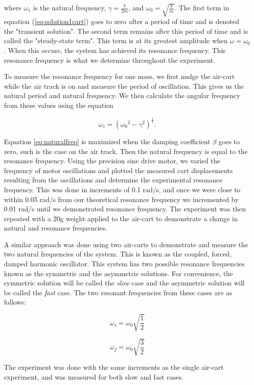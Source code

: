 \noindent where $\omega_1$ is the natural frequency, $\gamma = \frac{b}{2m}$, and $\omega_0 = \sqrt{\frac{k}{m}}$. The first term in equation (\ref{eq:solution1cart}) goes to zero after a period of time and is denoted the "transient solution". The second term remains after this period of time and is called the "steady-state term". This term is at its greatest amplitude when $\omega = \omega_0$. When this occurs, the system has achieved its resonance frequency. This resonance frequency is what we determine throughout the experiment.

\par To measure the resonance frequency for one mass, we first nudge the air-cart while the air track is on and measure the period of oscillation. This gives us the natural period and natural frequency. We then calculate the angular frequency from these values using the equation

\begin{equation}
\omega _1 = ({\omega_0}^2 - \gamma ^ 2)^{\frac{1}{2}}.
\label{eq:naturalfreq}
\end{equation}


\noindent Equation \ref{eq:naturalfreq} is maximized when the damping coefficient $\beta$ goes to zero, such is the case on the air track. Then the natural frequency is equal to the resonance frequency. Using the precision sine drive motor, we varied the frequency of motor oscillations and plotted the measured cart displacements resulting from the oscillations and determine the experimental resonance frequency. This was done in increments of 0.1 rad/s, and once we were close to within 0.05 rad/s from our theoretical resonance frequency we incremented by 0.01 rad/s until we demonstrated resonance frequency. The experiment was then repeated with a 20g weight applied to the air-cart to demonstrate a change in natural and resonance frequencies.

\par A similar approach was done using two air-carts to demonstrate and measure the two natural frequencies of the system. This is known as the coupled, forced, damped harmonic oscillator. This system has two possible resonance frequencies known as the symmetric and the asymmetric solutions. For convenience, the symmetric solution will be called the \textit{slow} case and the asymmetric solution will be called the \textit{fast} case. The two resonant frequencies from these cases are as follows:

\begin{equation}
\omega_s = \omega_0 \sqrt{\frac{1}{2}}
\label{eq:slow}
\end{equation}

\begin{equation}
\omega_f = \omega_0 \sqrt{\frac{3}{2}}
\label{eq:fast}
\end{equation}

\noindent The experiment was done with the same increments as the single air-cart experiment, and was measured for both slow and fast cases.




